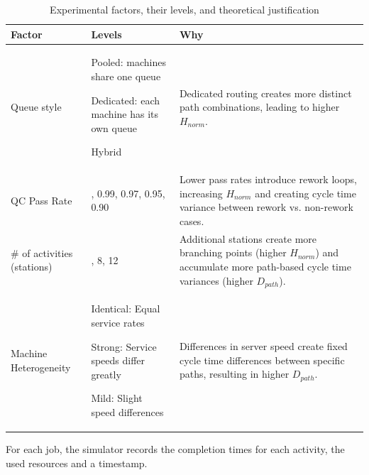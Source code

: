 \documentclass[
]{ceurart}
\begin{document}
\begin{table}[htbp]
    \centering
    \caption{Experimental factors, their levels, and theoretical justification}
    \label{tab:experimental_factors}
    \small 
    \renewcommand{\arraystretch}{1.4} 
    \begin{tabularx}{\textwidth}{>{\RaggedRight\arraybackslash}p{2.5cm} >{\RaggedRight\arraybackslash}X >{\RaggedRight\arraybackslash}X}
        \toprule
        \textbf{Factor} & \textbf{Levels} & \textbf{Why} \\
        \midrule
        Queue style & 
        \begin{tabitemize}
            \item Pooled: machines share one queue
            \item Dedicated: each machine has its own queue
            \item Hybrid
        \end{tabitemize} & 
        Dedicated routing creates more distinct path combinations, leading to higher $H_{norm}$. \\
        
        QC Pass Rate & 1.0, 0.99, 0.97, 0.95, 0.90 & 
        Lower pass rates introduce rework loops, increasing $H_{norm}$ and creating cycle time variance between rework vs. non-rework cases. \\
        
        \# of activities (stations) & 5, 8, 12 & 
        Additional stations create more branching points (higher $H_{norm}$) and accumulate more path-based cycle time variances (higher $D_{path}$). \\
        
        Machine Heterogeneity & 
        \begin{tabitemize}
            \item Identical: Equal service rates
            \item Strong: Service speeds differ greatly
            \item Mild: Slight speed differences
        \end{tabitemize} & 
        Differences in server speed create fixed cycle time differences between specific paths, resulting in higher $D_{path}$. \\
        \bottomrule
    \end{tabularx}
\end{table}

For each job, the simulator records the completion times for each activity, the used resources and a timestamp. 
\end{document}
